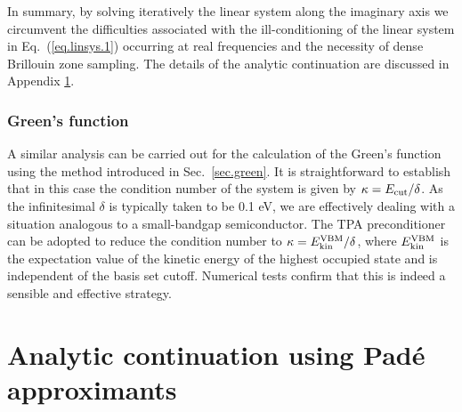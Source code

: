 \documentclass[twocolumn,prb,showpacs,superscriptaddress]{revtex4}
\begin{document}
In summary, by solving iteratively the linear system along the imaginary
axis we circumvent the difficulties associated with the ill-conditioning
of the linear system in Eq.\ (\ref{eq.linsys.1}) occurring at real frequencies
and the necessity of dense Brillouin zone sampling.
The details of the analytic continuation are discussed in Appendix \ref{app.pade}.

\subsubsection{Green's function}

A similar analysis can be carried out for the calculation of the Green's
function using the method introduced in Sec.\ \ref{sec.green}.
It is straightforward to establish that in this case the condition number
of the system is given by $\kappa = E_{\rm cut}/\delta$.
As the infinitesimal $\delta$ is typically taken to be 0.1 eV, we are effectively
dealing with a situation analogous to a small-bandgap semiconductor.
The TPA preconditioner can be adopted to reduce the condition number
to $\kappa = E_{\rm kin}^{\rm VBM}/\delta$, where $E_{\rm kin}^{\rm VBM}$
is the expectation value of the kinetic energy of the highest occupied state
and is independent of the basis set cutoff. Numerical tests confirm that this 
is indeed a sensible and effective strategy.

\section{Analytic continuation using Pad\'e approximants}\label{app.pade}
\end{document}
